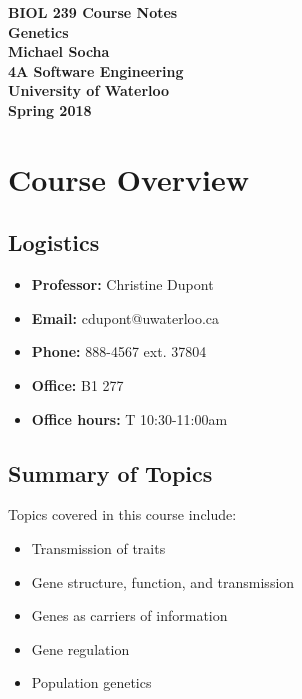 \documentclass[12pt,titlepage]{article}
\begin{document}
  \begin{titlepage}
    \vspace*{\fill}
    \centering

    \textbf{\Huge BIOL 239 Course Notes} \\ [0.4em]
    \textbf{\Large Genetics} \\ [1em]
    \textbf{\Large Michael Socha} \\ [1em]
    \textbf{\large 4A Software Engineering} \\
    \textbf{\large University of Waterloo} \\
    \textbf{\large Spring 2018} \\
    \vspace*{\fill}
  \end{titlepage}

  \newpage 

  \tableofcontents

  \newpage

  \section{Course Overview}
    \subsection{Logistics}
      \begin{itemize}
        \item \textbf{Professor:} Christine Dupont
        \item \textbf{Email:} cdupont@uwaterloo.ca
        \item \textbf{Phone:} 888-4567 ext. 37804
        \item \textbf{Office:} B1 277
        \item \textbf{Office hours:} T 10:30-11:00am
      \end{itemize}

    \subsection{Summary of Topics}
      Topics covered in this course include:
      \begin{itemize}
        \item Transmission of traits
        \item Gene structure, function, and transmission
        \item Genes as carriers of information
        \item Gene regulation
        \item Population genetics
      \end{itemize}
\end{document}
